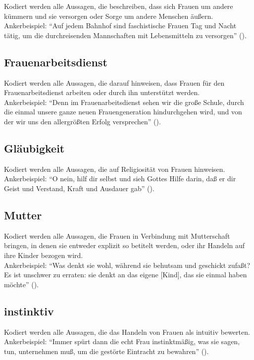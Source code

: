 \documentclass[12pt, titlepage=true, toc=bib]{scrartcl}
\begin{document}
{Kodiert werden alle Aussagen, die beschreiben, dass sich Frauen um andere kümmern und sie versorgen oder Sorge um andere Menschen äußern.\\
Ankerbeispiel: "`Auf jedem Bahnhof sind faschistische Frauen Tag und Nacht tätig, um die durchreisenden Mannschaften mit Lebensmitteln zu versorgen"' (\cite[3]{medici_faschistische_1941}).

\subsection*{Frauenarbeitsdienst}

Kodiert werden alle Aussagen, die darauf hinweisen, dass Frauen für den Frauenarbeitsdienst arbeiten oder durch ihn unterstützt werden.\\
Ankerbeispiel: "`Denn im Frauenarbeitsdienst sehen wir die große Schule, durch die einmal unsere ganze neuen Frauengeneration hindurchgehen wird, und von der wir uns den allergrößten Erfolg versprechen"' (\cite[775]{a._v._s._kameradschaft_1936}).

\subsection*{Gläubigkeit}
Kodiert werden alle Aussagen, die auf Religiosität von Frauen hinweisen. \\
Ankerbeispiel: "`O nein, hilf dir selbst und sieh Gottes Hilfe darin, daß er dir Geist und Verstand, Kraft und Ausdauer gab"' (\cite[669]{maltzahn_deutsche_1936}).

\subsection*{Mutter}

Kodiert werden alle Aussagen, die Frauen in Verbindung mit Mutterschaft bringen, in denen sie entweder explizit so betitelt werden, oder ihr Handeln auf ihre Kinder bezogen wird.\\
Ankerbeispiel: "`Was denkt sie wohl, während sie behutsam und geschickt zufaßt? Es ist unschwer zu erraten: sie denkt an das eigene [Kind], das sie einmal haben möchte"' (\cite[775]{a._v._s._kameradschaft_1936}).

\subsection*{instinktiv}

Kodiert werden alle Aussagen, die das Handeln von Frauen als intuitiv bewerten.\\
Ankerbeispiel: "`Immer spürt dann die echt Frau instinktmäßig, was sie sagen, tun, unternehmen muß, um die gestörte Eintracht zu bewahren"' (\cite[36]{weinhandl_wie_1941}).

}
\end{document}

